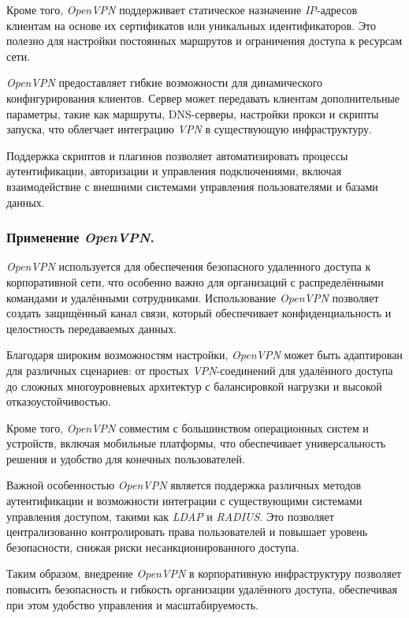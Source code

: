 Кроме того, \textit{OpenVPN} поддерживает статическое назначение \textit{IP}-адресов клиентам на основе их сертификатов или уникальных идентификаторов. Это полезно для настройки постоянных маршрутов и ограничения доступа к ресурсам сети.

\textit{OpenVPN} предоставляет гибкие возможности для динамического конфигурирования клиентов. Сервер может передавать клиентам дополнительные параметры, такие как маршруты, DNS-серверы, настройки прокси и скрипты запуска, что облегчает интеграцию \textit{VPN} в существующую инфраструктуру.

Поддержка скриптов и плагинов позволяет автоматизировать процессы аутентификации, авторизации и управления подключениями, включая взаимодействие с внешними системами управления пользователями и базами данных.

\subsubsection{Применение \textit{OpenVPN}.}
\textit{OpenVPN} используется для обеспечения безопасного удаленного доступа к корпоративной сети, что особенно важно для организаций с распределёнными командами и удалёнными сотрудниками. Использование \textit{OpenVPN} позволяет создать защищённый канал связи, который обеспечивает конфиденциальность и целостность передаваемых данных.

Благодаря широким возможностям настройки, \textit{OpenVPN} может быть адаптирован для различных сценариев: от простых \textit{VPN}-соединений для удалённого доступа до сложных многоуровневых архитектур с балансировкой нагрузки и высокой отказоустойчивостью.

Кроме того, \textit{OpenVPN} совместим с большинством операционных систем и устройств, включая мобильные платформы, что обеспечивает универсальность решения и удобство для конечных пользователей.

Важной особенностью \textit{OpenVPN} является поддержка различных методов аутентификации и возможности интеграции с существующими системами управления доступом, такими как \textit{LDAP} и \textit{RADIUS}. Это позволяет централизованно контролировать права пользователей и повышает уровень безопасности, снижая риски несанкционированного доступа.

Таким образом, внедрение \textit{OpenVPN} в корпоративную инфраструктуру позволяет повысить безопасность и гибкость организации удалённого доступа, обеспечивая при этом удобство управления и масштабируемость.

